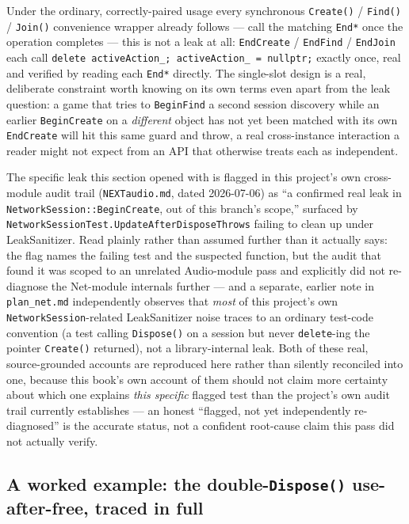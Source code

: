 Under the ordinary, correctly-paired usage every synchronous \texttt{Create()} /
\texttt{Find()} / \texttt{Join()} convenience wrapper already follows --- call the matching
\texttt{End*} once the operation completes --- this is not a leak at all:
\texttt{EndCreate} / \texttt{EndFind} / \texttt{EndJoin} each call \texttt{delete activeAction\_;
activeAction\_ = nullptr;} exactly once, real and verified by reading each \texttt{End*}
directly. The single-slot design is a real, deliberate constraint worth knowing on its own
terms even apart from the leak question: a game that tries to \texttt{BeginFind} a second
session discovery while an earlier \texttt{BeginCreate} on a \emph{different}
 object has not yet been matched with its own \texttt{EndCreate} will
hit this same guard and throw, a real cross-instance interaction a reader might not expect from
an API that otherwise treats each  as independent.

The specific leak this section opened with is flagged in this project's own cross-module audit
trail (\texttt{NEXTaudio.md}, dated 2026-07-06) as ``a confirmed real leak in
\texttt{NetworkSession::BeginCreate}, out of this branch's scope,'' surfaced by
\texttt{NetworkSessionTest.UpdateAfterDisposeThrows} failing to clean up under
LeakSanitizer. Read plainly rather than assumed further than it actually says: the flag names
the failing test and the suspected function, but the audit that found it was scoped to an
unrelated Audio-module pass and explicitly did not re-diagnose the Net-module internals further
--- and a separate, earlier note in \texttt{plan\_net.md} independently observes that
\emph{most} of this project's own \texttt{NetworkSession}-related LeakSanitizer noise traces to
an ordinary test-code convention (a test calling \texttt{Dispose()} on a session but never
\texttt{delete}-ing the pointer \texttt{Create()} returned), not a library-internal leak. Both
of these real, source-grounded accounts are reproduced here rather than silently reconciled into
one, because this book's own account of them should not claim more certainty about which one
explains \emph{this specific} flagged test than the project's own audit trail currently
establishes --- an honest ``flagged, not yet independently re-diagnosed'' is the accurate
status, not a confident root-cause claim this pass did not actually verify.

\subsection{A worked example: the double-\texttt{Dispose()} use-after-free, traced in full}

